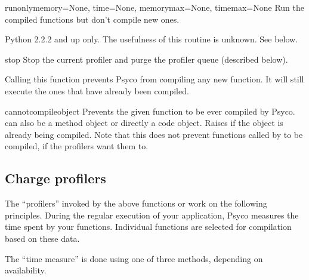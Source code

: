 \documentclass{manual}
\begin{document}
\begin{funcdesc}{runonly}{memory=None, time=None, memorymax=None, timemax=None}
  Run the compiled functions but don't compile new ones.

  Python 2.2.2 and up only.  The usefulness of this routine is unknown.  See below.
\end{funcdesc}

\begin{funcdesc}{stop}{}
  Stop the current profiler and purge the profiler queue (described below).

  Calling this function prevents Psyco from compiling any new function.  It will still execute the ones that have already been compiled.
\end{funcdesc}

\begin{funcdesc}{cannotcompile}{object}
  Prevents the given function to be ever compiled by Psyco.   can also be a method object or directly a code object.  Raises  if the object is already being compiled.  Note that this does not prevent functions called by  to be compiled, if the profilers want them to.
\end{funcdesc}



\subsection{Charge profilers}\label{charges}

The ``profilers'' invoked by the above functions  or  work on the following principles.  During the regular execution of your application, Psyco measures the time spent by your functions.  Individual functions are selected for compilation based on these data.

The ``time measure'' is done using one of three methods, depending on availability.
\end{document}
